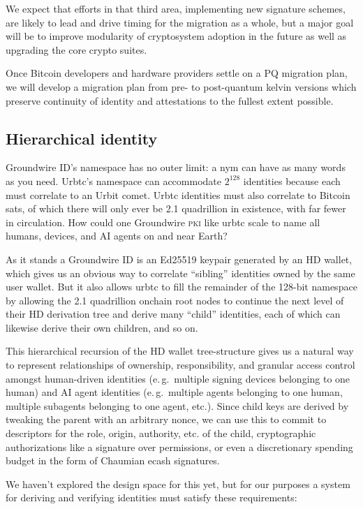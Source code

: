 \documentclass[twoside]{article}
\begin{document}
We expect that efforts in that third area, implementing new signature
schemes, are likely to lead and drive timing for the migration as a
whole, but a major goal will be to improve modularity of cryptosystem
adoption in the future as well as upgrading the core crypto suites.

Once Bitcoin developers and hardware providers settle on a PQ migration
plan, we will develop a migration plan from pre- to post-quantum kelvin
versions which preserve continuity of identity and attestations to the
fullest extent possible.

\subsection{Hierarchical identity}\label{hierarchical-identity}

Groundwire ID's namespace has no outer limit: a nym can have as many
words as you need. Urbtc's namespace can accommodate \(2^{128}\)
identities because each must correlate to an Urbit comet. Urbtc
identities must also correlate to Bitcoin sats, of which there will only
ever be 2.1 quadrillion in existence, with far fewer in circulation. How
could one Groundwire \textsc{pki} like urbtc scale to name all humans, devices,
and AI agents on and near Earth?

As it stands a Groundwire ID is an Ed25519 keypair generated by an HD
wallet, which gives us an obvious way to correlate ``sibling''
identities owned by the same user wallet. But it also allows urbtc to
fill the remainder of the 128-bit namespace by allowing the 2.1
quadrillion onchain root nodes to continue the next level of their HD
derivation tree and derive many ``child'' identities, each of which can
likewise derive their own children, and so on.

This hierarchical recursion of the HD wallet tree-structure gives us a
natural way to represent relationships of ownership, responsibility, and
granular access control amongst human-driven identities (e.\,g.\ multiple
signing devices belonging to one human) and AI agent identities
(e.\,g.\ multiple agents belonging to one human, multiple subagents
belonging to one agent, etc.). Since child keys are derived by tweaking
the parent with an arbitrary nonce, we can use this to commit to
descriptors for the role, origin, authority, etc. of the child,
cryptographic authorizations like a signature over permissions, or even
a discretionary spending budget in the form of Chaumian ecash
signatures.

We haven't explored the design space for this yet, but for our purposes
a system for deriving and verifying identities must satisfy these
requirements:
\end{document}
